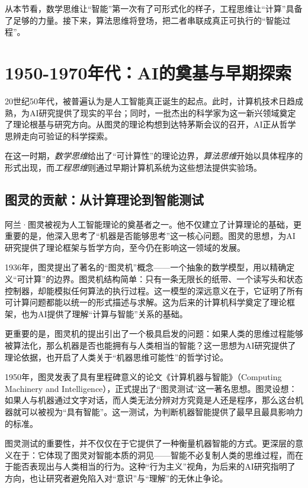 从本节看，数学思维让“智能”第一次有了可形式化的样子，工程思维让“计算”具备了足够的力量。接下来，算法思维将登场，把二者串联成真正可执行的“智能过程”。

\section{1950-1970年代：AI的奠基与早期探索}

20世纪50年代，被普遍认为是人工智能真正诞生的起点。此时，计算机技术日趋成熟，为AI研究提供了现实的平台；同时，一批杰出的科学家为这一新兴领域奠定了理论根基与研究方向。从图灵的理论构想到达特茅斯会议的召开，AI正从哲学思辨走向可验证的科学探索。

在这一时期，\emph{数学思维}给出了“可计算性”的理论边界，\emph{算法思维}开始以具体程序的形式出现，而\emph{工程思维}则通过早期计算机系统为这些想法提供实验场。

\subsection{图灵的贡献：从计算理论到智能测试}

阿兰·图灵被视为人工智能理论的奠基者之一。他不仅建立了计算理论的基础，更重要的是，他深入思考了“机器是否能够思考”这一核心问题。图灵的思想，为AI研究提供了理论框架与哲学方向，至今仍在影响这一领域的发展。

1936年，图灵提出了著名的“图灵机”概念——一个抽象的数学模型，用以精确定义“可计算”的边界。图灵机结构简单：只有一条无限长的纸带、一个读写头和状态控制器，却能模拟任何算法的执行过程。这一模型的深远意义在于，它证明了所有可计算问题都能以统一的形式描述与求解。这为后来的计算机科学奠定了理论框架，也为AI提供了理解“计算与智能”关系的基础。

更重要的是，图灵机的提出引出了一个极具启发的问题：如果人类的思维过程能够被算法化，那么机器是否也能拥有与人类相当的智能？这一思想为AI研究提供了理论依据，也开启了人类关于“机器思维可能性”的哲学讨论。

1950年，图灵发表了具有里程碑意义的论文《计算机器与智能》（Computing Machinery and Intelligence），正式提出了“图灵测试”这一著名思想。图灵设想：如果人与机器通过文字对话，而人类无法分辨对方究竟是人还是程序，那么这台机器就可以被视为“具有智能”。这一测试，为判断机器智能提供了最早且最具影响力的标准。

图灵测试的重要性，并不仅仅在于它提供了一种衡量机器智能的方式。更深层的意义在于：它体现了图灵对智能本质的洞见——智能不必复制人类的思维过程，而在于能否表现出与人类相当的行为。这种“行为主义”视角，为后来的AI研究指明了方向，也让研究者避免陷入对“意识”与“理解”的无休止争论。

